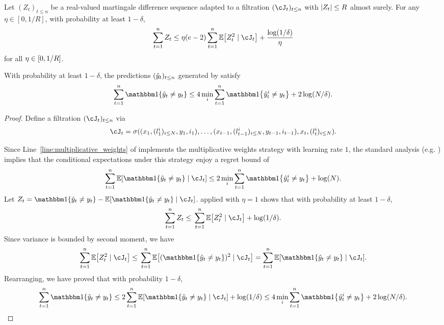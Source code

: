 \begin{lemma}
\label{lem:freedman}
Let $(Z_t)_{t\leq{}n}$ be a real-valued martingale difference sequence adapted to a filtration $(\cJ_t)_{t\leq{}n}$ with $\abs{Z_t}\leq{}R$ almost surely. For any $\eta\in[0, 1/R]$, with probability at least $1-\delta$,
\begin{equation}
\label{eq:freedman}
\sum_{t=1}^{n}Z_t \leq{} \eta(e-2)\sum_{t=1}^{n}\En\brk*{Z_t^{2} \mid{} \cJ_t} + \frac{\log(1/\delta)}{\eta}
\end{equation}
for all $\eta\in\brk*{0, 1/R}$.
\end{lemma}
\begin{lemma}
\label{lem:multiplicative_weights_conc}
With probability at least $1-\delta$, the predictions $(\yh_t)_{t\leq{}n}$ generated by  satisfy
\[
\sum_{t=1}^{n}\ind\crl*{\yh_{t}\neq{}y_t} \leq{} 4\min_{i}\sum_{t=1}^{n}\ind\crl*{\yh_{t}^{i}\neq{}y_t} + 2\log(N/\delta).
\]
\end{lemma}
\begin{proof}
Define a filtration $(\cJ_{t})_{t\leq{}n}$ via 
\[
\cJ_{t}=\sigma((x_1, (l_{1}^i)_{i\leq{}N}, y_1, i_1),\ldots,(x_{t-1}, (l_{t-1}^i)_{i\leq{}N}, y_{t-1}, i_{t-1}), x_t, (l_{t}^i)_{i\leq{}N}).
\]

Since Line~\ref*{line:multiplicative_weights} of  implements the multiplicative weights strategy with learning rate $1$, the standard analysis (e.g. \cite{PLG}) implies that the conditional expectations under this strategy enjoy a regret bound of
\[
\sum_{t=1}^{n}\En\brk*{\ind\crl*{\yh_{t}\neq{}y_t}\mid{}\cJ_{t}} \leq{} 2\min_{i}\sum_{t=1}^{n}\ind\crl*{\yh_{t}^{i}\neq{}y_t} + \log(N).
\]
Let $Z_{t}=\ind\crl*{\yh_{t}\neq{}y_t}-\En\brk*{\ind\crl*{\yh_{t}\neq{}y_t}\mid{}\cJ_{t}}$.  applied with $\eta=1$ shows that with probability at least $1-\delta$, 
\[
\sum_{t=1}^{n}Z_t \leq{} \sum_{t=1}^{n}\En\brk*{Z_t^{2} \mid{} \cJ_t} + \log(1/\delta).
\]
Since variance is bounded by second moment, we have
\[
\sum_{t=1}^{n}\En\brk*{Z_t^{2} \mid{} \cJ_t} \leq{} \sum_{t=1}^{n}\En\brk*{(\ind\crl*{\yh_{t}\neq{}y_t})^{2} \mid{} \cJ_t}
= \sum_{t=1}^{n}\En\brk*{\ind\crl*{\yh_{t}\neq{}y_t} \mid{} \cJ_t}.
\]
Rearranging, we have proved that with probability $1-\delta$,
\[
\sum_{t=1}^{n}\ind\crl*{\yh_{t}\neq{}y_t} \leq{}  2\sum_{t=1}^{n}\En\brk*{\ind\crl*{\yh_{t}\neq{}y_t} \mid{} \cJ_t} + \log(1/\delta) \leq{} 
4\min_{i}\sum_{t=1}^{n}\ind\crl*{\yh_{t}^{i}\neq{}y_t} + 2\log(N/\delta).
\]
\end{proof}

